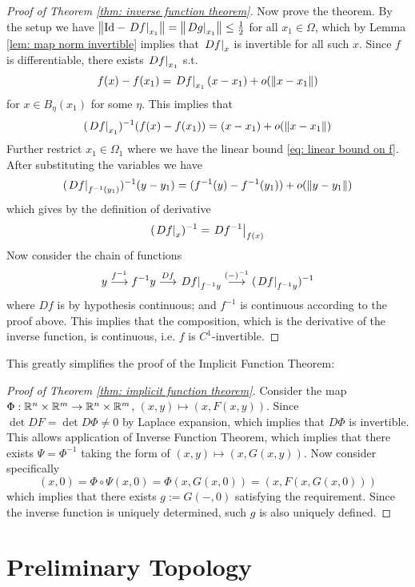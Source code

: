 \documentclass{article}
\begin{document}
\begin{proof}[Proof of Theorem \ref{thm: inverse function theorem}]
    Now prove the theorem. By the setup we have $\left\|\mathrm{Id} - \left.Df\right|_{x_1}\right\| = \left\|\left.Dg\right|_{x_1}\right\| \leq \frac{1}{2}$ for all $x_1 \in \Omega$, which by Lemma \ref{lem: map norm invertible} implies that $\left.Df\right|_{x}$ is invertible for all such $x$. Since $f$ is differentiable, there exists $\left.Df\right|_{x_1}$ s.t. 
    \[
        f(x) - f(x_1) = \left.Df\right|_{x_1} (x - x_1) + o(\left\|x - x_1\right\|)
    \]
    for $x \in B_{\eta}(x_1)$ for some $\eta$. This implies that
    \[
        (\left.Df\right|_{x_1})^{-1}(f(x) - f(x_1)) = (x - x_1) + o(\left\|x - x_1\right\|)
    \]
    Further restrict $x_1 \in \Omega_1$ where we have the linear bound \eqref{eq: linear bound on f}. After substituting the variables we have
    \[
        (\left.Df\right|_{f^{-1}(y_1)})^{-1}(y - y_1) = (f^{-1}(y) - f^{-1}(y_1)) + o(\left\|y - y_1\right\|)
    \]
    which gives by the definition of derivative
    \[
        (\left.Df\right|_{x})^{-1} = \left.Df^{-1}\right|_{f(x)} 
    \]
    Now consider the chain of functions
    \[
        y \overset{f^{-1}}{\longrightarrow} f^{-1}y \overset{Df}{\longrightarrow} \left.Df\right|_{f^{-1}y} \overset{(-)^{-1}}{\longrightarrow} (\left.Df\right|_{f^{-1}y})^{-1}
    \]
    where $Df$ is by hypothesis continuous; and $f^{-1}$ is continuous according to the proof above. This implies that the composition, which is the derivative of the inverse function, is continuous, i.e. $f$ is $C^1$-invertible.
\end{proof}

This greatly simplifies the proof of the Implicit Function Theorem:
\begin{proof}[Proof of Theorem \ref{thm: implicit function theorem}]
    Consider the map $\Phi: \mathbb{R}^n \times \mathbb{R}^m \to \mathbb{R}^n \times \mathbb{R}^m$, $(x, y) \mapsto (x, F(x, y))$. Since $\det DF = \det D\Phi \neq 0$ by Laplace expansion, which implies that $D\Phi$ is invertible. This allows application of Inverse Function Theorem, which implies that there exists $\Psi = \Phi^{-1}$ taking the form of $(x, y) \mapsto (x, G(x, y))$. Now consider specifically
    \[
        (x, 0) = \Phi \circ \Psi(x, 0) = \Phi(x, G(x, 0)) = (x, F(x, G(x, 0)))
    \]
    which implies that there exists $g := G(-, 0)$ satisfying the requirement. Since the inverse function is uniquely determined, such $g$ is also uniquely defined.
\end{proof}

\section{Preliminary Topology}
\end{document}
